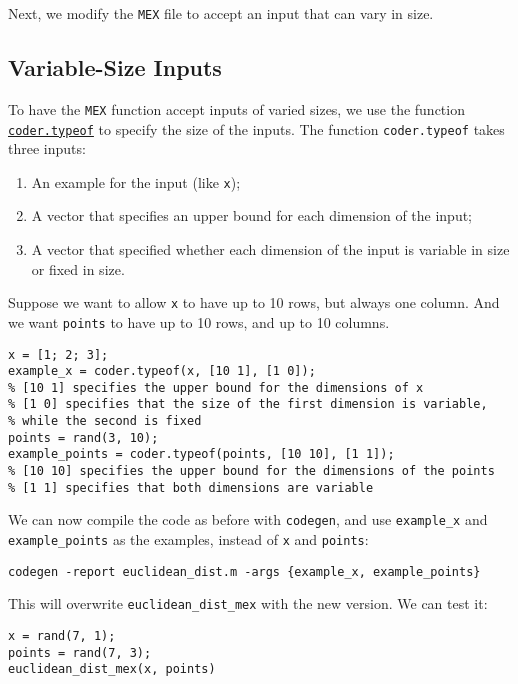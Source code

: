 \documentclass[12pt, a4paper]{article}
\begin{document}
Next, we modify the \texttt{MEX} file to accept an input that can vary in size.
\subsection{Variable-Size Inputs}
\label{sec:org4955076}
To have the \texttt{MEX} function accept inputs of varied sizes, we use the function \href{https://www.mathworks.com/help/coder/ref/coder.typeof.html}{\texttt{coder.typeof}} to specify the size of the inputs.
The function \texttt{coder.typeof} takes three inputs:
\begin{enumerate}
\item An example for the input (like \texttt{x});
\item A vector that specifies an upper bound for each dimension of the input;
\item A vector that specified whether each dimension of the input is variable in size or fixed in size.
\end{enumerate}

Suppose we want to allow \texttt{x} to have up to 10 rows, but always one column.
And we want \texttt{points} to have up to 10 rows, and up to 10 columns.
\lstset{language=matlab,label= ,caption= ,captionpos=b,firstnumber=1,numbers=left,style=Matlab-editor}
\begin{lstlisting}
x = [1; 2; 3];
example_x = coder.typeof(x, [10 1], [1 0]);
% [10 1] specifies the upper bound for the dimensions of x
% [1 0] specifies that the size of the first dimension is variable,
% while the second is fixed
points = rand(3, 10);
example_points = coder.typeof(points, [10 10], [1 1]);
% [10 10] specifies the upper bound for the dimensions of the points
% [1 1] specifies that both dimensions are variable
\end{lstlisting}

We can now compile the code as before with \texttt{codegen}, and use \texttt{example\_x} and \texttt{example\_points} as the examples, instead of \texttt{x} and \texttt{points}:
\lstset{language=matlab,label= ,caption= ,captionpos=b,firstnumber=1,numbers=left,style=Matlab-editor}
\begin{lstlisting}
codegen -report euclidean_dist.m -args {example_x, example_points}
\end{lstlisting}

This will overwrite \texttt{euclidean\_dist\_mex} with the new version.
We can test it:
\lstset{language=matlab,label= ,caption= ,captionpos=b,firstnumber=1,numbers=left,style=Matlab-editor}
\begin{lstlisting}
x = rand(7, 1);
points = rand(7, 3);
euclidean_dist_mex(x, points)
\end{lstlisting}
\end{document}
